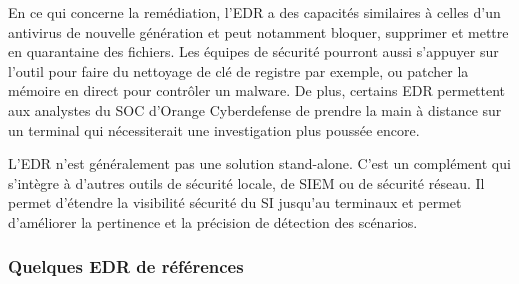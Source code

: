 En ce qui concerne la remédiation, l’EDR a des capacités similaires à celles d’un antivirus de nouvelle génération et peut notamment bloquer, supprimer et mettre en quarantaine des fichiers. Les équipes de sécurité pourront aussi s’appuyer sur l’outil pour faire du nettoyage de clé de registre par exemple, ou patcher la mémoire en direct pour contrôler un malware.  De plus, certains EDR permettent aux analystes du SOC d’Orange Cyberdefense de prendre la main à distance sur un terminal qui nécessiterait une investigation plus poussée encore.

L’EDR n’est généralement pas une solution stand-alone. C’est un  complément qui s’intègre à d'autres outils de sécurité locale, de SIEM ou de sécurité réseau. Il permet d’étendre la visibilité sécurité du SI jusqu’au terminaux et permet d'améliorer la pertinence et la précision de détection des scénarios.

\subsubsection{Quelques EDR de références}

